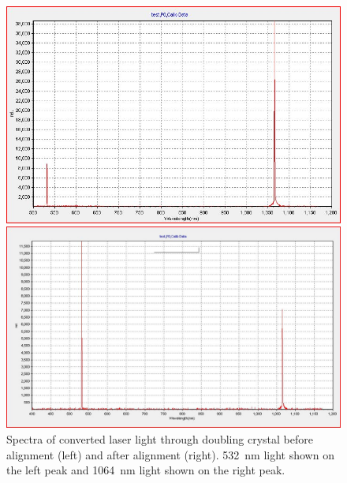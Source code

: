 \begin{figure}[h!]
  \centering
  \begin{minipage}{.45\textwidth}
	  \includegraphics[scale = .32]{Images/doublingCrystalWright2017.JPG}
  \end{minipage}
  \begin{minipage}{.45\textwidth}
	  \includegraphics[scale = .25]{Images/goodspectrum.JPG}
  \end{minipage}
  \caption{Spectra of converted laser light through doubling crystal before alignment (left) and after alignment (right). \SI{532}{\nano \meter} light shown on the left peak and \SI{1064}{\nano \meter} light shown on the right peak.}
  \label{fig:conversionspectrum1}
\end{figure}

